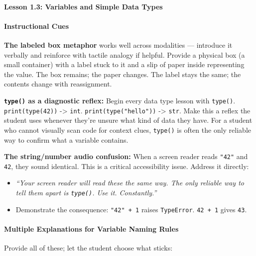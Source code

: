 \documentclass[
  justified,
  openright,
]{tufte-book}
\let\subsubsection\paragraph
\let\paragraph\paragraph
\let\subsubsection\paragraph
\let\paragraph\paragraph
\providecommand{\tightlist}{%
  \setlength{\itemsep}{0pt}\setlength{\parskip}{0pt}}
\begin{document}
\subsubsection{Lesson 1.3: Variables and Simple Data
Types}\label{lesson-1.3-variables-and-simple-data-types}

\paragraph{Instructional Cues}\label{instructional-cues-4}

\textbf{The labeled box metaphor} works well across modalities ---
introduce it verbally and reinforce with tactile analogy if helpful.
Provide a physical box (a small container) with a label stuck to it and
a slip of paper inside representing the value. The box remains; the
paper changes. The label stays the same; the contents change with
reassignment.

\textbf{\texttt{type()} as a diagnostic reflex:} Begin every data type
lesson with \texttt{type()}. \texttt{print(type(42))} -\textgreater{}
\texttt{int}. \texttt{print(type("hello"))} -\textgreater{}
\texttt{str}. Make this a reflex the student uses whenever they're
unsure what kind of data they have. For a student who cannot visually
scan code for context clues, \texttt{type()} is often the only reliable
way to confirm what a variable contains.

\textbf{The string/number audio confusion:} When a screen reader reads
\texttt{"42"} and \texttt{42}, they sound identical. This is a critical
accessibility issue. Address it directly:

\begin{itemize}
\tightlist
\item
  \emph{``Your screen reader will read these the same way. The only
  reliable way to tell them apart is \texttt{type()}. Use it.
  Constantly.''}
\item
  Demonstrate the consequence: \texttt{"42"\ +\ 1} raises
  \texttt{TypeError}. \texttt{42\ +\ 1} gives \texttt{43}.
\end{itemize}

\paragraph{Multiple Explanations for Variable Naming
Rules}\label{multiple-explanations-for-variable-naming-rules}

Provide all of these; let the student choose what sticks:
\end{document}
